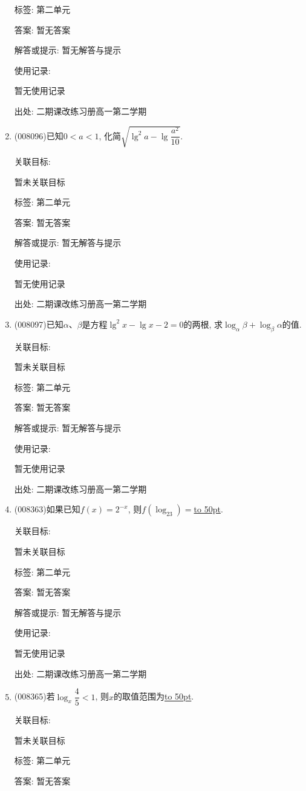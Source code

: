 \documentclass[10pt,a4paper]{article}
\newcommand{\blank}[1]{\underline{\hbox to #1pt{}}}
\begin{document}
\begin{enumerate}[1.]
标签: 第二单元

答案: 暂无答案

解答或提示: 暂无解答与提示

使用记录:

暂无使用记录


出处: 二期课改练习册高一第二学期
\item { (008096)}已知$0<a<1$, 化简$\sqrt {\lg ^2a-\lg \dfrac{a^2}{10}}$.


关联目标:

暂未关联目标



标签: 第二单元

答案: 暂无答案

解答或提示: 暂无解答与提示

使用记录:

暂无使用记录


出处: 二期课改练习册高一第二学期
\item { (008097)}已知$\alpha$、$\beta$是方程$\lg ^2x-\lg x-2=0$的两根, 求$\log _{\alpha }\beta +\log _{\beta }\alpha$的值.


关联目标:

暂未关联目标



标签: 第二单元

答案: 暂无答案

解答或提示: 暂无解答与提示

使用记录:

暂无使用记录


出处: 二期课改练习册高一第二学期
\item { (008363)}如果已知$f(x)=2^{-x}$, 则$f(\log _23)=$\blank{50}.


关联目标:

暂未关联目标



标签: 第二单元

答案: 暂无答案

解答或提示: 暂无解答与提示

使用记录:

暂无使用记录


出处: 二期课改练习册高一第二学期
\item { (008365)}若$\log _x\dfrac 45<1$, 则$x$的取值范围为\blank{50}.


关联目标:

暂未关联目标



标签: 第二单元

答案: 暂无答案


\end{enumerate}
\end{document}
